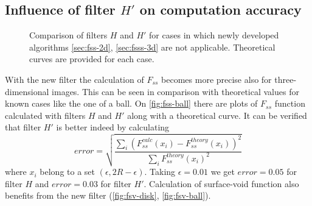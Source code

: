 \documentclass[reprint,amsmath,amssymb,aps,pre,showkeys,showpacs]{revtex4-1}
\begin{document}
\subsection{Influence of filter $H'$ on computation accuracy}

\begin{figure}
  \centering
  \hfill
  \hfill
  \caption[]{Comparison of filters $H$ and $H'$ for cases in which newly
    developed algorithms \cref{sec:fss-2d}, \cref{sec:fsss-3d} are not
    applicable. Theoretical curves are provided for each case.}
  \label{fig:not-covered}
\end{figure}
With the new filter the calculation of $F_{ss}$ becomes more precise also for
three-dimensional images. This can be seen in comparison with theoretical values
for known cases like the one of a ball. On \cref{fig:fss-ball} there are plots
of $F_{ss}$ function calculated with filters $H$ and $H'$ along with a
theoretical curve. It can be verified that filter $H'$ is better indeed by
calculating
\begin{equation}
  error = \sqrt{\frac{\sum_i (F_{ss}^{calc}(x_i) -
      F_{ss}^{theory}(x_i))^2}{\sum_i F_{ss}^{theory}(x_i)^2}}
  \label{eq:error}
\end{equation}
where $x_i$ belong to a set $(\epsilon, 2R - \epsilon)$. Taking
$\epsilon = 0.01$ we get $error = 0.05$ for filter $H$ and $error = 0.03$ for
filter $H'$. Calculation of surface-void function also benefits from the new
filter (\cref{fig:fsv-disk}, \cref{fig:fsv-ball}).
\end{document}
